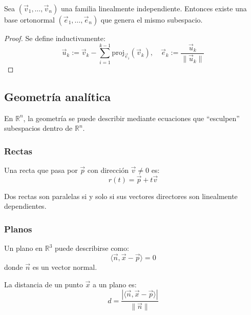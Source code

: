 \documentclass[10pt]{article}
\newcommand{\R}{\mathbb{R}}
\begin{document}
\begin{theorem}
  Sea $(\vec{v}_1,\dots,\vec{v}_n)$ una familia linealmente independiente.
  Entonces existe una base ortonormal $(\vec{e}_1,\dots,\vec{e}_n)$ que genera el mismo subespacio.
\end{theorem}

\begin{proof}
  Se define inductivamente:
  \[
    \vec{u}_k := \vec{v}_k - \sum_{i=1}^{k-1} \mathrm{proj}_{\vec{e}_i}(\vec{v}_k),
    \quad
    \vec{e}_k := \frac{\vec{u}_k}{\|\vec{u}_k\|}
  \]
\end{proof}

\subsection{Geometría analítica}

En $ \R^n $, la geometría se puede describir mediante ecuaciones que ``esculpen'' subespacios dentro de $ \R^n $.

\subsubsection{Rectas}

\begin{definition}
  Una recta que pasa por $\vec{p}$ con dirección $\vec{v} \neq 0$ es:
  \[ r(t) = \vec{p} + t\vec{v} \]
\end{definition}

\begin{theorem}
  Dos rectas son paralelas si y solo si sus vectores directores son linealmente dependientes.
\end{theorem}

\subsubsection{Planos}

\begin{definition}[Plano]
  Un plano en $\R^3$ puede describirse como:
  \[
    \langle \vec{n}, \vec{x} - \vec{p} \rangle = 0
  \]
  donde $\vec{n}$ es un vector normal.
\end{definition}

\begin{theorem}
  La distancia de un punto $\vec{x}$ a un plano es:
  \[
    d = \frac{|\langle \vec{n}, \vec{x} - \vec{p} \rangle|}{\|\vec{n}\|}
  \]
\end{theorem}
\end{document}

